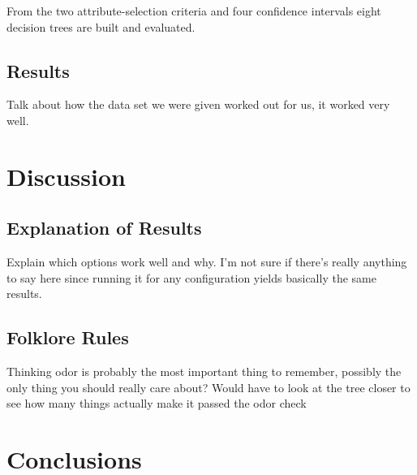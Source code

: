 \documentclass{IEEEtran}
\begin{document}
From the two attribute-selection criteria and four confidence
intervals eight decision trees are built and evaluated.

\subsection{Results}
Talk about how the data set we were given worked out for us, it worked
very well.

\section{Discussion}
\subsection{Explanation of Results}
Explain which options work well and why.
I'm not sure if there's really anything to say here since running it
for any configuration yields basically the same results.

\subsection{Folklore Rules}
Thinking odor is probably the most important thing to remember,
possibly the only thing you should really care about? Would have to
look at the tree closer to see how many things actually make it passed
the odor check

\section{Conclusions}

\printbibliography
\end{document}
